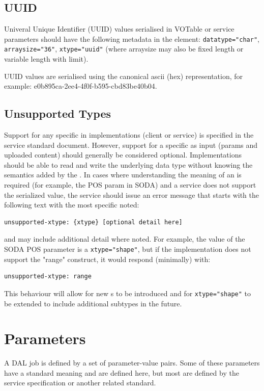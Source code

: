 \documentclass[11pt,letter]{ivoa}
\begin{document}
\subsection{UUID}
Univeral Unique Identifier (UUID) values serialised in VOTable or service parameters 
should have the following metadata in the  element: \verb|datatype="char"|, 
\verb|arraysize="36"|, \verb|xtype="uuid"| (where arraysize may also be fixed length or 
variable length with limit).

UUID values \citep{std:RFC4122} are serialised using the canonical ascii (hex) 
representation, for example: e0b895ca-2ee4-4f0f-b595-cbd83be40b04.

\subsection{Unsupported Types}

Support for any specific  in implementations (client or service) is specified in
the service standard document. However, support for a specific  as input (params
and uploaded content) should generally be considered optional. Implementations should 
be able to read and write the underlying data type without knowing the semantics added 
by the . In cases where understanding the meaning of an  is required (for 
example, the POS param in SODA) and a service does not support the serialized value, 
the service should issue an error message that starts with the following text with the 
most specific  noted:
\begin{verbatim}
unsupported-xtype: {xtype} [optional detail here]
\end{verbatim}
and may include additional detail where noted. For example, the value of the SODA POS parameter
is a \verb|xtype="shape"|, but if the implementation does not support the "range" construct, it 
would respond (minimally) with:
\begin{verbatim}
unsupported-xtype: range
\end{verbatim}
This behaviour will allow for new s to be introduced and for \verb|xtype="shape"| 
to be extended to include additional subtypes in the future.

\section{Parameters}
\label{sec:parameters}
A DAL job is defined by a set of parameter-value pairs. Some of these parameters
have a standard meaning and are defined here, but most are defined by the
service specification or another related standard.
\end{document}
